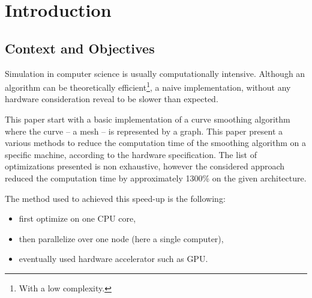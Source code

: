 \documentclass[fleqn,11pt]{SelfArx} %
\affiliation{\textsuperscript{1}RB812 \hfill \textsuperscript{2}AC5612 \hfill \textsuperscript{3}GF210}
\begin{document}



\flushbottom %

\maketitle %

\tableofcontents %

\thispagestyle{empty} %


\section{Introduction}
\subsection{Context and Objectives}

Simulation in computer science is usually computationally intensive. Although an algorithm can be theoretically efficient\footnote{With a low complexity.}, a naive implementation, without any hardware consideration reveal to be slower than expected.

This paper start with a basic implementation of a curve smoothing algorithm where the curve -- a mesh -- is represented by a graph. This paper present a various methods to reduce the computation time of the smoothing algorithm on a specific machine, according to the hardware specification. The list of optimizations presented is non exhaustive, however the considered approach reduced the computation time by approximately 1300\% on the given architecture.

The method used to achieved this speed-up is the following:
\begin{itemize}  \vspace{-4mm}
\item first optimize on one CPU core, \vspace{-4mm}
\item then parallelize over one node (here a single computer), \vspace{-4mm}
\item eventually used hardware accelerator such as GPU.
\end{itemize}
\end{document}
